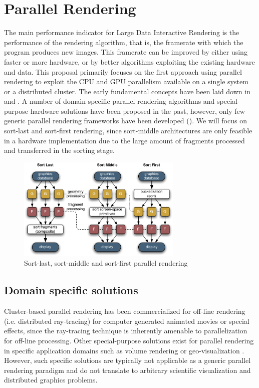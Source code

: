 \section{Parallel Rendering}

The main performance indicator for Large Data Interactive Rendering is the
performance of the rendering algorithm, that is, the framerate with which the
program produces new images. This framerate can be improved by either using
faster or more hardware, or by better algorithms exploiting the existing
hardware and data. This proposal primarily focuses on the first approach using
parallel rendering to exploit the CPU and GPU parallelism available on a single
system or a distributed cluster.  The early fundamental concepts have been laid
down in \cite{MCEF:94} and \cite{Crockett:97}. A number of domain specific
parallel rendering algorithms and special-purpose hardware solutions have been
proposed in the past, however, only few generic parallel rendering frameworks
have been developed (). We will focus on sort-last and sort-first
rendering, since sort-middle architectures are only feasible in a hardware
implementation due to the large amount of fragments processed and transferred in
the sorting stage.

\begin{figure}[ht]\center
\includegraphics[width=0.7\textwidth]{images/all_sorts}%
\caption{Sort-last, sort-middle and sort-first parallel rendering\label{fSorts}}
\end{figure}


\subsection{Domain specific solutions}

Cluster-based parallel rendering has been commercialized for off-line rendering
(i.e. distributed ray-tracing) for computer generated animated movies or special
effects, since the ray-tracing technique is inherently amenable to
parallelization for off-line processing. Other special-purpose solutions exist
for parallel rendering in specific application domains such as volume rendering
\cite{LWMT:97,Wittenbrink:98,HSCSM:00,SL:02,GS:02,NSJLYZ:05} or
geo-visualization \cite{VR:91,AG:95,LDC:96,JLMV:06}. However, such specific
solutions are typically not applicable as a generic parallel rendering paradigm
and do not translate to arbitrary scientific visualization and distributed
graphics problems.

